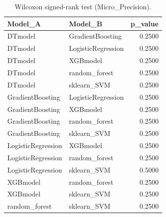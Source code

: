 \begin{table}[t]
\centering
\begin{tabular}{llr}
\toprule
Model_A & Model_B & p_value \\
\midrule
DTmodel & GradientBoosting & 0.2500 \\
DTmodel & LogisticRegression & 0.2500 \\
DTmodel & XGBmodel & 0.2500 \\
DTmodel & random_forest & 0.2500 \\
DTmodel & sklearn_SVM & 0.2500 \\
GradientBoosting & LogisticRegression & 0.2500 \\
GradientBoosting & XGBmodel & 0.2500 \\
GradientBoosting & random_forest & 0.2500 \\
GradientBoosting & sklearn_SVM & 0.2500 \\
LogisticRegression & XGBmodel & 0.2500 \\
LogisticRegression & random_forest & 0.2500 \\
LogisticRegression & sklearn_SVM & 0.5000 \\
XGBmodel & random_forest & 0.2500 \\
XGBmodel & sklearn_SVM & 0.2500 \\
random_forest & sklearn_SVM & 0.2500 \\
\bottomrule
\end{tabular}
\caption{Wilcoxon signed-rank test (Micro_Precision).}
\label{tab:wilcoxon_Micro_Precision}
\end{table}